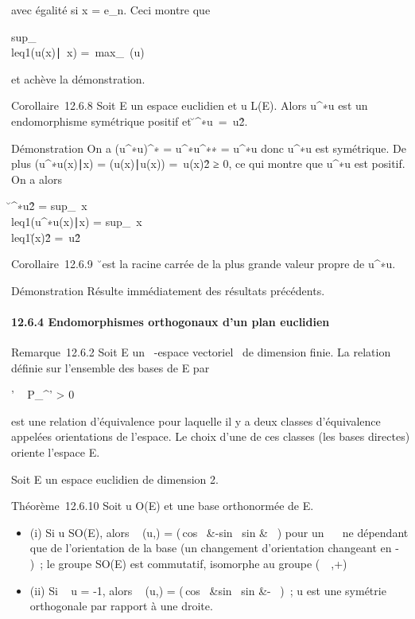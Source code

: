 \documentclass[]{article}
\begin{document}
avec égalité si x = e_n. Ceci montre que

sup_\x\\leq1(u(x)\mathrel∣~x)
=\
max_\lambda~\in{}(u)~\lambda~

et achève la démonstration.

Corollaire~12.6.8 Soit E un espace euclidien et u \in L(E). Alors
u^∗u est un endomorphisme symétrique positif et
\u^∗u\
=\ u\^2.

Démonstration On a (u^∗u)^∗ =
u^∗u^∗∗ = u^∗u donc u^∗u est
symétrique. De plus (u^∗u(x)∣x) =
(u(x)∣u(x)) =\
u(x)\^2 ≥ 0, ce qui montre que
u^∗u est positif. On a alors

\u^∗u\^2
= sup_\
x\\leq1(u^∗u(x)∣x)
= sup_\
x\\leq1\u(x)\^2
=\ u\^2

Corollaire~12.6.9 \u\
est la racine carrée de la plus grande valeur propre de u^∗u.

Démonstration Résulte immédiatement des résultats précédents.

\paragraph{12.6.4 Endomorphismes orthogonaux d'un plan euclidien}

Remarque~12.6.2 Soit E un \mathbb{R}~-espace vectoriel ~de dimension finie. La
relation définie sur l'ensemble des bases de E par

'\Leftrightarrow
\mathrm{det}~
P_^' \textgreater{} 0

est une relation d'équivalence pour laquelle il y a deux classes
d'équivalence appelées orientations de l'espace. Le choix d'une de ces
classes (les bases directes) oriente l'espace E.

Soit E un espace euclidien de dimension 2.

Théorème~12.6.10 Soit u \in O(E) et  une base orthonormée de E.

\begin{itemize}
\itemsep1pt\parskip0pt
\item
  (i) Si u \in SO(E), alors
  \mathrmMat~ (u,\mathcal{E}) =
  \left
  (\matrix\,cos~
  \theta&-sin~ \theta\cr
  sin \theta &\cos~
  \theta\right ) pour un \theta \in {}~\pi~ ne dépendant que de
  l'orientation de la base  (un changement d'orientation changeant \theta en
  - \theta)~; le groupe SO(E) est commutatif, isomorphe au groupe (~\pi~,+)
\item
  (ii) Si \mathrm{det}~ u =
  -1, alors \mathrmMat~
  (u,\mathcal{E}) = \left
  (\matrix\,cos~
  \theta&sin~ \theta \cr
  sin \theta&-\cos~
  \theta\right )~; u est une symétrie orthogonale par
  rapport à une droite.
\end{itemize}
\end{document}
